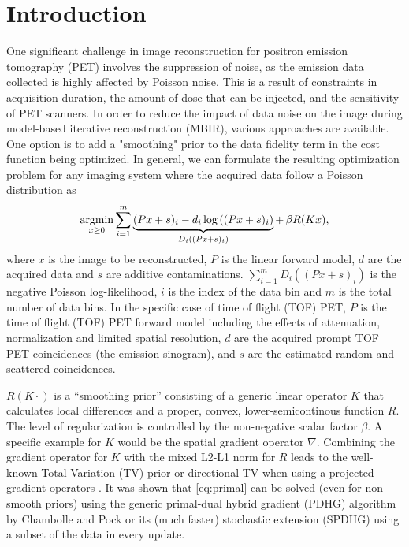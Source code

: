 \section{Introduction}

One significant challenge in image reconstruction for positron emission tomography (PET) 
involves the suppression of noise, as the emission data collected is highly affected by Poisson noise. 
This is a result of constraints in acquisition duration, the amount of dose that can be injected, 
and the sensitivity of PET scanners. 
In order to reduce the impact of data noise on the image during model-based iterative reconstruction (MBIR), 
various approaches are available. 
One option is to add a "smoothing" prior to the data fidelity term in the cost function being optimized.
In general, we can formulate the resulting optimization problem for any imaging system where the
acquired data follow a Poisson distribution as
%
\begin{equation}
\argmin _{x\geq 0} \sum_{i=1}^{m} \underbrace{(Px + s)_i -  d_i \log \left( (Px + s)_i \right)}_{D_i((Px+s)_i)} + \, \beta R(Kx),
\label{eq:primal} 
\end{equation}
%
where $x$ is the image to be reconstructed, $P$ is the linear forward model, $d$ are the acquired
data and $s$ are additive contaminations.
$\sum_{i=1}^m D_i((Px + s)_i)$ is the negative Poisson log-likelihood, 
$i$ is the index of the data bin and $m$ is the total number of data bins.
In the specific case of time of flight (TOF) PET, $P$ is the time of flight (TOF) PET
forward model including the effects of attenuation, normalization and limited spatial resolution, 
$d$ are the acquired prompt TOF PET coincidences (the emission sinogram), 
and $s$ are the estimated random and scattered coincidences. 

$R(K\cdot)$ is a ``smoothing prior'' consisting of a generic linear operator $K$ that calculates 
local differences and a proper, convex, lower-semicontinous function $R$.
The level of regularization is controlled by the non-negative scalar factor $\beta$.
A specific example for $K$ would be the spatial gradient operator $\nabla$.
Combining the gradient operator for $K$ with the mixed L2-L1 norm for $R$ leads to the well-known 
Total Variation (TV) prior \cite{Rudin1992} or directional TV when using a projected gradient
operators \cite{Ehrhardt2016}.
It was shown that \eqref{eq:primal} can be solved (even for non-smooth priors) using the 
generic primal-dual hybrid gradient (PDHG) algorithm by Chambolle and Pock \cite{Chambolle2011}
or its (much faster) stochastic extension (SPDHG) \cite{Ehrhardt2019} using a subset of the data in every update.

